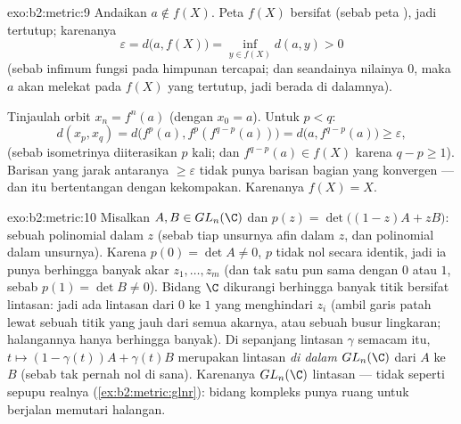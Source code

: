\begin{solution}{exo:b2:metric:9}
Andaikan $a \notin f(X)$. Peta $f(X)$ bersifat  (sebab peta
), jadi tertutup; karenanya
\[
\varepsilon = d\bigl(a, f(X)\bigr)
= \inf_{y \in f(X)} d(a, y) > 0
\]
(sebab infimum fungsi  pada himpunan  tercapai; dan
seandainya nilainya $0$, maka $a$ akan melekat pada $f(X)$ yang tertutup,
jadi berada di dalamnya).

Tinjaulah orbit $x_n = f^n(a)$ (dengan $x_0 = a$). Untuk $p < q$:
\[
d(x_p, x_q) = d\bigl(f^p(a), f^p(f^{q-p}(a))\bigr)
= d\bigl(a, f^{q-p}(a)\bigr) \geq \varepsilon,
\]
(sebab isometrinya diiterasikan $p$ kali; dan $f^{q-p}(a) \in f(X)$
karena $q - p \geq 1$). Barisan yang jarak antaranya $\geq \varepsilon$
tidak punya barisan bagian yang konvergen --- dan itu bertentangan
dengan kekompakan. Karenanya $f(X) = X$.
\end{solution}

\begin{solution}{exo:b2:metric:10}
Misalkan $A, B \in GL_n(\C)$ dan $p(z) = \det\bigl((1-z)A + zB\bigr)$:
sebuah polinomial dalam $z$ (sebab tiap unsurnya afin dalam $z$, dan
 polinomial dalam unsurnya). Karena $p(0) = \det A \neq 0$,
$p$ tidak nol secara identik, jadi ia punya berhingga banyak akar $z_1,
\dots, z_m$ (dan tak satu pun sama dengan $0$ atau $1$, sebab $p(1) =
\det B \neq 0$). Bidang $\C$ dikurangi berhingga banyak titik bersifat
 lintasan: jadi ada lintasan dari $0$ ke $1$ yang menghindari
$z_i$ (ambil garis patah lewat sebuah titik yang jauh dari semua akarnya,
atau sebuah busur lingkaran; halangannya hanya berhingga banyak). Di
sepanjang lintasan $\gamma$ semacam itu, $t \mapsto (1 - \gamma(t))A +
\gamma(t)B$ merupakan lintasan  \emph{di dalam} $GL_n(\C)$ dari
$A$ ke $B$ (sebab  tak pernah nol di sana). Karenanya
$GL_n(\C)$  lintasan --- tidak seperti sepupu realnya
(\cref{ex:b2:metric:glnr}): bidang kompleks punya ruang untuk berjalan
memutari halangan.
\end{solution}


